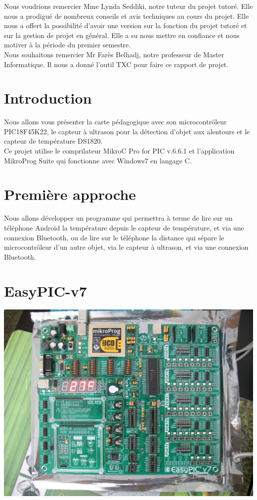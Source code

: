 \documentclass[a4paper, 12pt]{book}
\newcounter{program}[subsection]
\begin{document}
Nous voudrions remercier Mme Lynda Seddiki, notre tuteur du projet tutoré. Elle nous a prodigué de nombreux conseils et avis techniques au cours du projet. Elle nous a offert la possibilité d’avoir une version sur la fonction du projet tutoré et sur la gestion de projet en général. Elle a su nous mettre en confiance et nous motiver à la période du premier semestre.\\

Nous souhaitons remercier Mr Farès Belhadj, notre professeur de Master Informatique. Il nous a donné l’outil TXC pour faire ce rapport de projet.


\chapter{Introduction}
Nous allons vous présenter la carte pédagogique avec son microcontrôleur PIC18F45K22, le capteur à ultrason pour la détection d'objet aux alentours et le capteur de température DS1820.\\
Ce projet utilise le comprilateur MikroC Pro for PIC v.6.6.1 et l'application MikroProg Suite qui fonctionne avec Windows7 en langage C. \\

\chapter{Première approche}
Nous allons développer un programme qui permettra à terme de lire sur un téléphone Android la température depuis le capteur de température, et via une connexion Bluetooth, 
ou de lire sur le téléphone la distance qui sépare le microcontrôleur d'un autre objet, via le capteur à ultrason, et via une connexion Bluetooth.\\

\chapter{EasyPIC-v7}
\includegraphics[width=1.0\linewidth]{images/easyPIC-v7.jpg}
\end{document}
